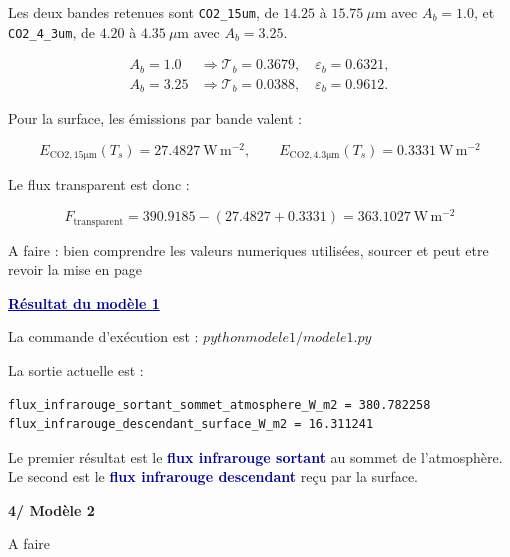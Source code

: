 \documentclass[11pt,a4paper]{article}
\newcommand{\code}[1]{\texttt{#1}}
\newcommand{\fluxunit}{\mathrm{W\,m^{-2}}}
\newcommand{\motcle}[1]{\textcolor{DarkBlue}{\textbf{#1}}}
\newcommand{\bloc}[1]{\vspace{0.9em}\noindent\textcolor{DarkBlue}{\underline{\textbf{#1}}}\par\vspace{0.35em}}
\newcommand{\partietitre}[1]{%
    \vspace{1.1em}
    {\Large\bfseries\textcolor{DocRed}{#1}}\par
    \vspace{0.35em}
}
\begin{document}
Les deux bandes retenues sont \code{CO2\_15um}, de $14.25$ à $15.75\ \mu\mathrm{m}$ avec $A_b=1.0$, et \code{CO2\_4\_3um}, de $4.20$ à $4.35\ \mu\mathrm{m}$ avec $A_b=3.25$.

\[
\begin{aligned}
A_b=1.0 &\Rightarrow \mathcal{T}_b=0.3679,\quad \varepsilon_b=0.6321,\\
A_b=3.25 &\Rightarrow \mathcal{T}_b=0.0388,\quad \varepsilon_b=0.9612.
\end{aligned}
\]

Pour la surface, les émissions par bande valent :

\[
E_{\mathrm{CO2,15\mu m}}(T_s)=27.4827\ \fluxunit,
\qquad
E_{\mathrm{CO2,4.3\mu m}}(T_s)=0.3331\ \fluxunit
\]

Le flux transparent est donc :

\[
F_{\mathrm{transparent}}
=
390.9185-(27.4827+0.3331)
=
363.1027\ \fluxunit
\]

\textcolor{green!50!black}{A faire : bien comprendre les valeurs numeriques utilisées, sourcer et peut etre revoir la mise en page}

\bloc{Résultat du modèle 1}

La commande d'exécution est : $python modele1/modele1.py$

La sortie actuelle est :

\begin{verbatim}
flux_infrarouge_sortant_sommet_atmosphere_W_m2 = 380.782258
flux_infrarouge_descendant_surface_W_m2 = 16.311241
\end{verbatim}

Le premier résultat est le \motcle{flux infrarouge sortant} au sommet de l'atmosphère. Le second est le \motcle{flux infrarouge descendant} reçu par la surface.


\partietitre{4/ Modèle 2}

\textcolor{green!50!black}{A faire}
\end{document}

